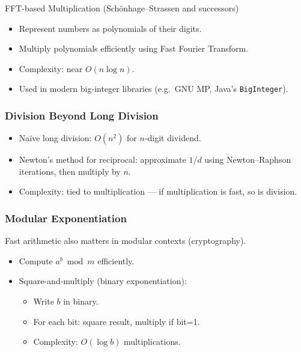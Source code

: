 \documentclass[
  letterpaper,
  DIV=11,
  numbers=noendperiod]{scrreprt}
\providecommand{\tightlist}{%
  \setlength{\itemsep}{0pt}\setlength{\parskip}{0pt}}
\begin{document}
FFT-based Multiplication (Schönhage--Strassen and successors)

\begin{itemize}
\tightlist
\item
  Represent numbers as polynomials of their digits.
\item
  Multiply polynomials efficiently using Fast Fourier Transform.
\item
  Complexity: near \(O(n \log n)\).
\item
  Used in modern big-integer libraries (e.g.~GNU MP, Java's
  \texttt{BigInteger}).
\end{itemize}

\subsubsection{Division Beyond Long
Division}\label{division-beyond-long-division}

\begin{itemize}
\tightlist
\item
  Naïve long division: \(O(n^2)\) for \(n\)-digit dividend.
\item
  Newton's method for reciprocal: approximate \(1/d\) using
  Newton--Raphson iterations, then multiply by \(n\).
\item
  Complexity: tied to multiplication --- if multiplication is fast, so
  is division.
\end{itemize}

\subsubsection{Modular Exponentiation}\label{modular-exponentiation}

Fast arithmetic also matters in modular contexts (cryptography).

\begin{itemize}
\item
  Compute \(a^b \bmod m\) efficiently.
\item
  Square-and-multiply (binary exponentiation):

  \begin{itemize}
  \tightlist
  \item
    Write \(b\) in binary.
  \item
    For each bit: square result, multiply if bit=1.
  \item
    Complexity: \(O(\log b)\) multiplications.
  \end{itemize}
\end{itemize}
\end{document}
